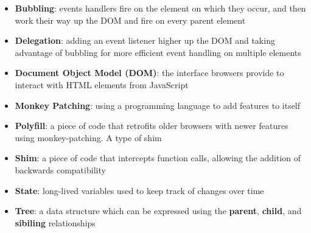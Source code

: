 \begin{itemize}[leftmargin=*]
    \item
        \textbf{Bubbling}:
        events handlers fire on the element on which they occur, and then work their way up the DOM and fire on every parent element
    \item
        \textbf{Delegation}:
        adding an event listener higher up the DOM and taking advantage of bubbling for more efficient event handling on multiple elements
    \item
        \textbf{Document Object Model (DOM)}:
        the interface browsers provide to interact with HTML elements from JavaScript
    \item
        \textbf{Monkey Patching}:
        using a programming language to add features to itself
    \item
        \textbf{Polyfill}:
        a piece of code that retrofits older browsers with newer features using monkey-patching. A type of shim
    \item
        \textbf{Shim}:
        a piece of code that intercepts function calls, allowing the addition of backwards compatibility
    \item
        \textbf{State}:
        long-lived variables used to keep track of changes over time
    \item
        \textbf{Tree}:
        a data structure which can be expressed using the \textbf{parent}, \textbf{child}, and \textbf{sibiling} relationships
\end{itemize}
